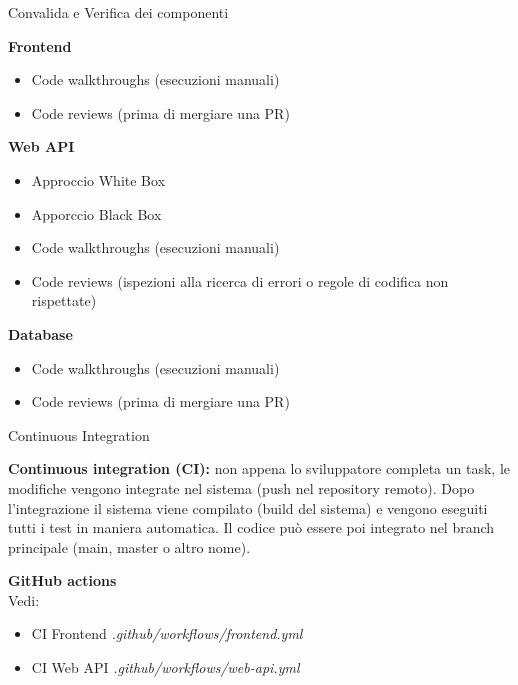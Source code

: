 \documentclass[10pt]{beamer}
\begin{document}
\begin{frame}{Convalida e Verifica dei componenti}

	\textbf{Frontend}
	\begin{itemize}

		\item
		Code walkthroughs (esecuzioni manuali)

		\item
		Code reviews (prima di mergiare una PR) 

	\end{itemize}

	\textbf{Web API}
	\begin{itemize}

		\item
		Approccio White Box

		\item
		Apporccio Black Box

		\item
		Code walkthroughs (esecuzioni manuali)

		\item
		Code reviews (ispezioni alla ricerca di errori o regole di codifica non rispettate)

	\end{itemize}

	\textbf{Database}
	\begin{itemize}

		\item
		Code walkthroughs (esecuzioni manuali)

		\item
		Code reviews (prima di mergiare una PR)

	\end{itemize}

\end{frame}

\begin{frame}{Continuous Integration}

	\textbf{Continuous integration (CI):} non appena lo sviluppatore completa un task, le modifiche vengono integrate nel sistema (push nel repository remoto). Dopo l’integrazione il sistema viene compilato (build del sistema) e vengono eseguiti tutti i test in maniera automatica. Il codice può essere poi integrato nel branch principale (main, master o altro nome).


	\textbf{GitHub actions}\\
	Vedi:
	\begin{itemize}
	
		\item
		CI Frontend \emph{.github/workflows/frontend.yml}
		
		\item
		CI Web API \emph{.github/workflows/web-api.yml}

	\end{itemize}

\end{frame}
\end{document}
